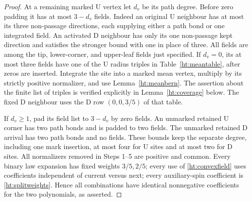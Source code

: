 \begin{proof}
At a remaining marked U vertex let \(d_v\) be its path degree. Before
zero padding it has at most \(3-d_v\) fields. Indeed an original U
neighbour has at most its three non-passage directions, each supplying
either a path bond or one integrated field. An activated D neighbour
has only its one non-passage kept direction and satisfies the stronger
bound with one in place of three. All fields are among the tip,
lower-corner, and upper-leaf fields just specified. If \(d_v=0\),
its at most three fields have one of the U radius triples in
Table~\ref{ht:meantable}, after zeros are inserted. Integrate the site
into a marked mean vertex, multiply by its strictly positive normalizer,
and use Lemma~\ref{ht:meanbern}. The assertion about the finite list
of triples is verified explicitly in Lemma~\ref{ht:coverage} below.
The fixed D neighbour uses the D row \((0,0,3/5)\) of that table.

If \(d_v\ge1\), pad its field list to \(3-d_v\) by zero fields.
An unmarked retained U corner has two path bonds and is padded to two
fields. The unmarked retained D arrival has two path bonds and no
fields. These bounds keep the separate degree, including one mark
insertion, at most four for U sites and at most two for D sites.
All normalizers removed in Steps 1--5 are positive and common.
Every binary law expansion has fixed weights \(3/5,2/5\); every use
of \eqref{ht:convexfield} uses coefficients independent of current
versus next; every auxiliary-spin coefficient is
\eqref{ht:splitweights}. Hence all combinations have identical
nonnegative coefficients for the two polynomials, as asserted.
\end{proof}

